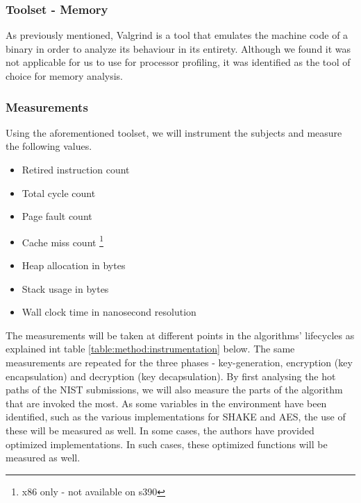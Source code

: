 \subsubsection{Toolset - Memory}

As previously mentioned, Valgrind is a tool that emulates the machine code of a binary in order to analyze its behaviour in its entirety. Although we found it was not applicable for us to use for processor profiling, it was identified as the tool of choice for memory analysis.

\subsubsection{Measurements}

Using the aforementioned toolset, we will instrument the subjects and measure the following values.

\begin{itemize}
    \item Retired instruction count
    \item Total cycle count
    \item Page fault count
    \item Cache miss count \footnote{x86 only - not available on s390}
    \item Heap allocation in bytes
    \item Stack usage in bytes
    \item Wall clock time in nanosecond resolution
\end{itemize}

The measurements will be taken at different points in the algorithms' lifecycles as explained int table \ref{table:method:instrumentation} below. The same measurements are repeated for the three phases - key-generation, encryption (key encapsulation) and decryption (key decapsulation). By first analysing the hot paths of the NIST submissions, we will also measure the parts of the algorithm that are invoked the most. As some variables in the environment have been identified, such as the various implementations for SHAKE and AES, the use of these will be measured as well. In some cases, the authors have provided optimized implementations. In such cases, these optimized functions will be measured as well.

